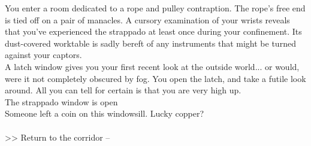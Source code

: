 You enter a room dedicated to a rope and pulley contraption. The rope’s free end is tied off on a pair of manacles. A cursory examination of your wrists reveals that you’ve experienced the strappado at least once during your confinement. Its dust-covered worktable is sadly bereft of any instruments that might be turned against your captors.\\

A latch window gives you your first recent look at the outside world... or would, were it not completely obscured by fog. You open the latch, and take a futile look around. All you can tell for certain is that you are very high up.\\
 The strappado window is open\\

Someone left a coin on this windowsill. Lucky copper?\\
\\

>> Return to the corridor -- 